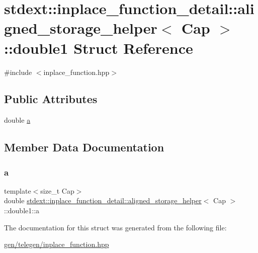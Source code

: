 \hypertarget{structstdext_1_1inplace__function__detail_1_1aligned__storage__helper_1_1double1}{}\section{stdext\+:\+:inplace\+\_\+function\+\_\+detail\+:\+:aligned\+\_\+storage\+\_\+helper$<$ Cap $>$\+:\+:double1 Struct Reference}
\label{structstdext_1_1inplace__function__detail_1_1aligned__storage__helper_1_1double1}


{\ttfamily \#include $<$inplace\+\_\+function.\+hpp$>$}

\subsection*{Public Attributes}
\begin{DoxyCompactItemize}
\item 
double \hyperlink{structstdext_1_1inplace__function__detail_1_1aligned__storage__helper_1_1double1_a21bd2ba02bde2bd642aff6bdee37407f}{a}
\end{DoxyCompactItemize}


\subsection{Member Data Documentation}
\mbox{\label{structstdext_1_1inplace__function__detail_1_1aligned__storage__helper_1_1double1_a21bd2ba02bde2bd642aff6bdee37407f}} 
\subsubsection{\texorpdfstring{a}{a}}
{\footnotesize\ttfamily template$<$size\+\_\+t Cap$>$ \\
double \hyperlink{unionstdext_1_1inplace__function__detail_1_1aligned__storage__helper}{stdext\+::inplace\+\_\+function\+\_\+detail\+::aligned\+\_\+storage\+\_\+helper}$<$ Cap $>$\+::double1\+::a}



The documentation for this struct was generated from the following file\+:\begin{DoxyCompactItemize}
\item 
\hyperlink{gen_2telegen_2inplace__function_8hpp}{gen/telegen/inplace\+\_\+function.\+hpp}\end{DoxyCompactItemize}
